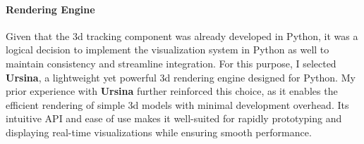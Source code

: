 \paragraph{Rendering Engine}
Given that the \acrshort{3d} tracking component was already developed in Python, it was a logical decision to implement the visualization system in Python as well to maintain consistency and streamline integration. For this purpose, I selected \textbf{Ursina}, a lightweight yet powerful \acrfull{3d} rendering engine designed for Python. My prior experience with \textbf{Ursina} further reinforced this choice, as it enables the efficient rendering of simple \acrshort{3d} models with minimal development overhead. Its intuitive API and ease of use makes it well-suited for rapidly prototyping and displaying real-time visualizations while ensuring smooth performance.

